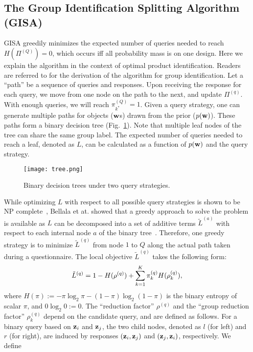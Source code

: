\documentclass[onecolumn,11pt]{article}
\newcommand{\cutequationup}{\vspace*{-0.12in}}
\newcommand{\cutequationdown}{\vspace*{-0.12in}}
\newcommand{\cutequationup}{}
\newcommand{\cutequationdown}{}
\begin{document}
\subsection{The Group Identification Splitting Algorithm (GISA)}
\label{subsec:alg}
GISA greedily minimizes the expected number of queries needed to reach $H(\Pi^{(Q)})=0$, which occurs iff all probability mass is on one design. Here we explain the algorithm in the context of optimal product identification. Readers are referred to \cite{bellala2012group} for the derivation of the algorithm for group identification. Let a ``path'' be a sequence of queries and responses. Upon receiving the response for each query, we move from one node on the path to the next, and update $\Pi^{(q)}$. With enough queries, we will reach $\pi^{(Q)}_{k^*} = 1$. Given a query strategy, one can generate multiple paths for objects (${\bf w}$s) drawn from the prior ($p({\bf w})$). These paths form a binary decision tree (Fig.~\ref{fig:tree}). Note that multiple leaf nodes of the tree can share the same group label. The expected number of queries needed to reach a leaf, denoted as $L$, can be
calculated as a function of $p({\bf w})$ and the query strategy.
\begin{figure}
\centering
\texttt{[image: tree.png]}\label{fig:tree}
\caption{Binary decision trees under two query strategies.}
\end{figure}
While optimizing $L$ with respect to all possible query strategies is shown to
be NP complete~\cite{hyafil1976constructing}, Bellala et at. showed that a greedy approach to solve the problem is available as $L$ can be decomposed into a set of additive terms $\tilde{L}^{(a)}$ with respect
to each internal node $a$ of the binary tree~\cite{bellala2012group}.
Therefore, one greedy strategy is to minimize $\tilde{L}^{(q)}$ from node $1$ to $Q$ along the actual path taken during a questionnaire. The local objective $\tilde{L}^{(q)}$ takes the following form:
\cutequationup
\begin{equation}
\tilde{L}^{(q)}=1-H(\rho^{(q)})+\sum_{k=1}^{K}\pi_{k}^{(q)} H(\rho_{k}^{(q)}),
\cutequationdown
\label{eq:obj}
\end{equation}
where $H(\pi):=-\pi \log_2 \pi - (1-\pi)\log_2 (1-\pi)$ is the binary entropy of scalar $\pi$, and $0\log_2 0 :=0$. The ``reduction factor'' $\rho^{(q)}$ and the ``group reduction factor'' $\rho_{k}^{(q)}$ depend on the candidate query, and are defined as follows. For a binary query based on ${\bf z}_{i}$ and ${\bf z}_{j}$, the two child nodes, denoted as $l$ (for left) and $r$ (for right), are induced by responses $({\bf z}_{i}, {\bf z}_{j})$ and $({\bf z}_{j}, {\bf
z}_{i})$, respectively. We define
\end{document}
